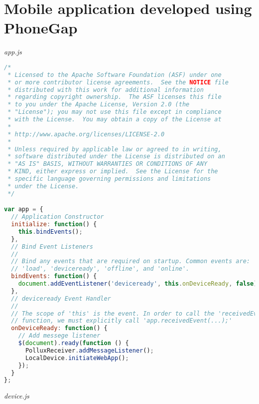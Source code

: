 \section{Mobile application developed using PhoneGap} \label{App:AppendixB}
\emph{app.js}
\begin{lstlisting}[language=JavaScript]
/*
 * Licensed to the Apache Software Foundation (ASF) under one
 * or more contributor license agreements.  See the NOTICE file
 * distributed with this work for additional information
 * regarding copyright ownership.  The ASF licenses this file
 * to you under the Apache License, Version 2.0 (the
 * "License"); you may not use this file except in compliance
 * with the License.  You may obtain a copy of the License at
 *
 * http://www.apache.org/licenses/LICENSE-2.0
 *
 * Unless required by applicable law or agreed to in writing,
 * software distributed under the License is distributed on an
 * "AS IS" BASIS, WITHOUT WARRANTIES OR CONDITIONS OF ANY
 * KIND, either express or implied.  See the License for the
 * specific language governing permissions and limitations
 * under the License.
 */

var app = {
  // Application Constructor
  initialize: function() {
    this.bindEvents();  
  },
  // Bind Event Listeners
  //
  // Bind any events that are required on startup. Common events are:
  // 'load', 'deviceready', 'offline', and 'online'.
  bindEvents: function() {
    document.addEventListener('deviceready', this.onDeviceReady, false);
  },
  // deviceready Event Handler
  //
  // The scope of 'this' is the event. In order to call the 'receivedEvent'
  // function, we must explicitly call 'app.receivedEvent(...);'
  onDeviceReady: function() {
    // Add messege listener
    $(document).ready(function () {
      PolluxReceiver.addMessageListener();
      LocalDevice.initiateWebApp();
    });
  }
};
\end{lstlisting}
\emph{device.js}
